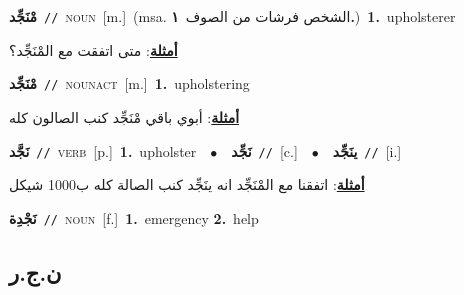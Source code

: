 \documentclass[10pt,a4paper,twoside]{article} %
\begin{document}
\begin{multicols}{2}
{\setlength\topsep{0pt}\textbf{\foreignlanguage{arabic}{مْنَجِّد}}\ {\color{gray}\texttt{//}\color{black}}\ \textsc{noun}\ [m.]\ \color{gray}(msa. \foreignlanguage{arabic}{الشخص فرشات من الصوف}~\foreignlanguage{arabic}{\textbf{١.}})\color{black}\ \textbf{1.}~upholsterer\  \begin{flushright}\color{gray}\foreignlanguage{arabic}{\textbf{\underline{\foreignlanguage{arabic}{أمثلة}}}: متى اتفقت مع المْنَجِّد؟}\end{flushright}\color{black}} \vspace{2mm}

{\setlength\topsep{0pt}\textbf{\foreignlanguage{arabic}{مْنَجِّد}}\ {\color{gray}\texttt{//}\color{black}}\ \textsc{noun\textunderscore act}\ [m.]\ \textbf{1.}~upholstering\  \begin{flushright}\color{gray}\foreignlanguage{arabic}{\textbf{\underline{\foreignlanguage{arabic}{أمثلة}}}: أبوي باقي مْنَجِّد كنب الصالون كله}\end{flushright}\color{black}} \vspace{2mm}

{\setlength\topsep{0pt}\textbf{\foreignlanguage{arabic}{نَجَّد}}\ {\color{gray}\texttt{//}\color{black}}\ \textsc{verb}\ [p.]\ \textbf{1.}~upholster\ \ $\bullet$\ \ \setlength\topsep{0pt}\textbf{\foreignlanguage{arabic}{نَجِّد}}\ {\color{gray}\texttt{//}\color{black}}\ [c.]\ \ $\bullet$\ \ \setlength\topsep{0pt}\textbf{\foreignlanguage{arabic}{ينَجِّد}}\ {\color{gray}\texttt{//}\color{black}}\ [i.]\  \begin{flushright}\color{gray}\foreignlanguage{arabic}{\textbf{\underline{\foreignlanguage{arabic}{أمثلة}}}: اتفقنا مع المْنَجِّد انه ينَجِّد كنب الصالة كله ب1000 شيكل}\end{flushright}\color{black}} \vspace{2mm}

{\setlength\topsep{0pt}\textbf{\foreignlanguage{arabic}{نَجْدِة}}\ {\color{gray}\texttt{//}\color{black}}\ \textsc{noun}\ [f.]\ \textbf{1.}~emergency  \textbf{2.}~help\ } \vspace{2mm}

\vspace{-3mm}
\subsection*{\color{blue}\foreignlanguage{arabic}{ن.ج.ر}\color{blue}{}} 


\end{multicols}
\end{document}
